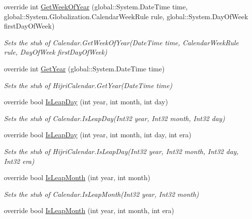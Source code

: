 \begin{DoxyCompactItemize}
override int \hyperlink{class_system_1_1_globalization_1_1_fakes_1_1_stub_hijri_calendar_af228ecfa628ba7d37e5a3bbcd511f747}{Get\-Week\-Of\-Year} (global\-::\-System.\-Date\-Time time, global\-::\-System.\-Globalization.\-Calendar\-Week\-Rule rule, global\-::\-System.\-Day\-Of\-Week first\-Day\-Of\-Week)
\begin{DoxyCompactList}\small\item\em Sets the stub of Calendar.\-Get\-Week\-Of\-Year(\-Date\-Time time, Calendar\-Week\-Rule rule, Day\-Of\-Week first\-Day\-Of\-Week)\end{DoxyCompactList}\item 
override int \hyperlink{class_system_1_1_globalization_1_1_fakes_1_1_stub_hijri_calendar_a421df7168b58972c5c904cefff7c5122}{Get\-Year} (global\-::\-System.\-Date\-Time time)
\begin{DoxyCompactList}\small\item\em Sets the stub of Hijri\-Calendar.\-Get\-Year(\-Date\-Time time)\end{DoxyCompactList}\item 
override bool \hyperlink{class_system_1_1_globalization_1_1_fakes_1_1_stub_hijri_calendar_a5417ce454bf0584c1ab87fb678c9df91}{Is\-Leap\-Day} (int year, int month, int day)
\begin{DoxyCompactList}\small\item\em Sets the stub of Calendar.\-Is\-Leap\-Day(\-Int32 year, Int32 month, Int32 day)\end{DoxyCompactList}\item 
override bool \hyperlink{class_system_1_1_globalization_1_1_fakes_1_1_stub_hijri_calendar_ab6f4fc82eb3e4e552ea1063f68e8bb19}{Is\-Leap\-Day} (int year, int month, int day, int era)
\begin{DoxyCompactList}\small\item\em Sets the stub of Hijri\-Calendar.\-Is\-Leap\-Day(\-Int32 year, Int32 month, Int32 day, Int32 era)\end{DoxyCompactList}\item 
override bool \hyperlink{class_system_1_1_globalization_1_1_fakes_1_1_stub_hijri_calendar_a685fb094f1e9723b756021e2ce9a6bae}{Is\-Leap\-Month} (int year, int month)
\begin{DoxyCompactList}\small\item\em Sets the stub of Calendar.\-Is\-Leap\-Month(\-Int32 year, Int32 month)\end{DoxyCompactList}\item 
override bool \hyperlink{class_system_1_1_globalization_1_1_fakes_1_1_stub_hijri_calendar_ab1bbc8f503cb74fbf151b83dee44e30d}{Is\-Leap\-Month} (int year, int month, int era)

\end{DoxyCompactItemize}
